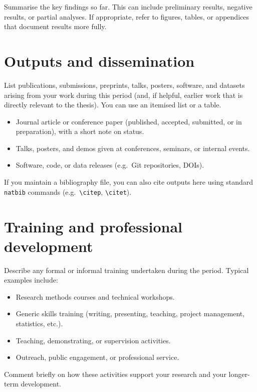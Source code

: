 \documentclass[sans,oneside,numeric,raggedright]{qreport}
\begin{document}
Summarise the key findings so far. This can include preliminary results,
negative results, or partial analyses. If appropriate, refer to figures,
tables, or appendices that document results more fully.

\section{Outputs and dissemination}

List publications, submissions, preprints, talks, posters, software, and
datasets arising from your work during this period (and, if helpful, earlier
work that is directly relevant to the thesis). You can use an itemised list
or a table.

\begin{itemize}[leftmargin=2em]
  \item Journal article or conference paper (published, accepted, submitted,
        or in preparation), with a short note on status.
  \item Talks, posters, and demos given at conferences, seminars, or internal
        events.
  \item Software, code, or data releases (e.g.\ Git repositories, DOIs).
\end{itemize}

If you maintain a bibliography file, you can also cite outputs here using
standard \texttt{natbib} commands (e.g.\ \verb|\citep|, \verb|\citet|).

\section{Training and professional development}

Describe any formal or informal training undertaken during the period.
Typical examples include:

\begin{itemize}[leftmargin=2em]
  \item Research methods courses and technical workshops.
  \item Generic skills training (writing, presenting, teaching, project
        management, statistics, etc.).
  \item Teaching, demonstrating, or supervision activities.
  \item Outreach, public engagement, or professional service.
\end{itemize}

Comment briefly on how these activities support your research and your
longer-term development.
\end{document}
